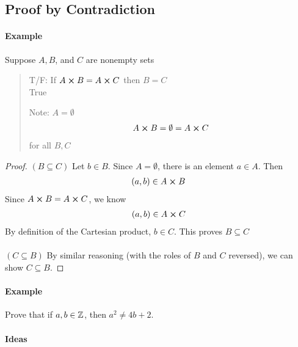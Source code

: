 \documentclass[../main.tex]{subfiles}
\begin{document}
\newpage
{}

\subsection{Proof by Contradiction}
\paragraph{Example}

Suppose $A, B$, and $C$ are nonempty sets

\begin{quote}
    T/F: If $A \cross B = A \cross C$ then $B = C$ \\
    \color{draculagreen} True

    Note: $A = \emptyset$
    \begin{align*}
        A \cross B = \emptyset = A \cross C
    \end{align*}
    for all $B, C$
\end{quote}

\begin{proof}
    $(B \subseteq C)$ Let $b \in B$. 
    Since $A = \emptyset$, there is an element $a \in A$. Then
    \begin{align*}
        (a,b) \in A \cross B
    \end{align*}
    Since $A \cross B = A \cross C$, we know
    \begin{align*}
        (a,b) \in A \cross C
    \end{align*}
    By definition of the Cartesian product, $b \in C$. This proves $B \subseteq C$

    \paragraph{}
    $(C \subseteq B)$ By similar reasoning (with the roles of $B$ and $C$ reversed),
    we can show $C \subseteq B$.
\end{proof}

\paragraph{Example} Prove that if $a, b \in \mathbb{Z}$, then $a^2 \neq 4b +2$.

\paragraph{Ideas}
\end{document}
